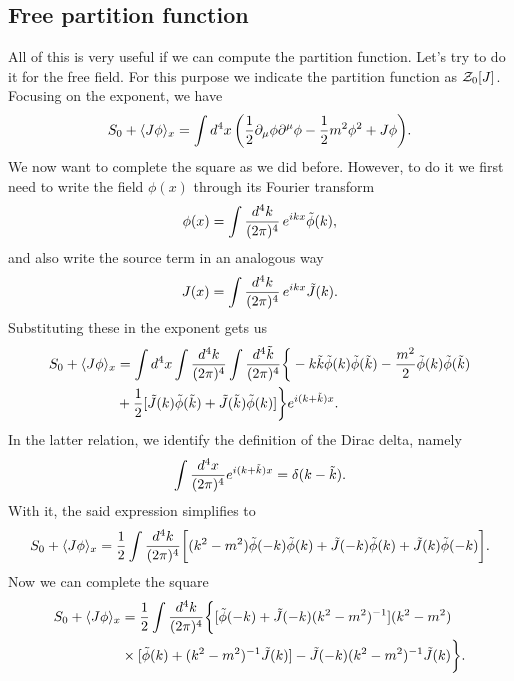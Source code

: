 \subsection{Free partition function}
All of this is very useful if we can compute the partition function. Let's try to do it for the free field. For this purpose we indicate the partition function as $\mathcal{Z}_0[J]$. Focusing on the exponent, we have 
\begin{equation}
    S_0 + \langle J\phi \rangle_x = \int d^4x\,\bigg(\frac{1}{2}\partial_\mu\phi\partial^\mu\phi - \frac{1}{2}m^2\phi^2 + J\phi\bigg).
\end{equation}
We now want to complete the square as we did before. However, to do it we first need to write the field $\phi(x)$ through its Fourier transform 
\begin{equation}
    \phi(x) = \int\frac{d^4k}{(2\pi)^4}\,e^{ikx}\tilde{\phi}(k),
\end{equation}
and also write the source term in an analogous way 
\begin{equation}
    J(x) = \int\frac{d^4k}{(2\pi)^4}\,e^{ikx}\tilde{J}(k).
\end{equation}
Substituting these in the exponent gets us  
\begin{equation}
    \begin{split}
        S_0 + \langle J\phi \rangle_x &= \int d^4x\int\frac{d^4k}{(2\pi)^4}\int\frac{d^4\tilde{k}}{(2\pi)^4}\bigg\{-k\tilde{k}\tilde{\phi}(k)\tilde{\phi}(\tilde{k}) - \frac{m^2}{2}\tilde{\phi}(k)\tilde{\phi}(\tilde{k}) \\
        &+ \frac{1}{2}[\tilde{J}(k)\tilde{\phi}(\tilde{k}) + \tilde{J}(\tilde{k})\tilde{\phi}(k)]\bigg\}e^{i(k + \tilde{k})x}.
    \end{split}
\end{equation}
In the latter relation, we identify the definition of the Dirac delta, namely 
\begin{equation}
\label{eq: Dirac delta definition}
    \int \frac{d^4x}{(2\pi)^4}e^{i(k + \tilde{k})x} = \delta(k - \tilde{k}).
\end{equation}
With it, the said expression simplifies to 
\begin{equation}
    S_0 + \langle J\phi \rangle_x = \frac{1}{2}\int\frac{d^4k}{(2\pi)^4}\bigg[(k^2 - m^2)\tilde{\phi}(-k)\tilde{\phi}(k) + \tilde{J}(-k)\tilde{\phi}(k) + \tilde{J}(k)\tilde{\phi}(-k)\bigg].
\end{equation}
Now we can complete the square 
\begin{equation}
    \begin{split}
        S_0 + \langle J\phi \rangle_x &= \frac{1}{2}\int\frac{d^4k}{(2\pi)^4}\bigg\{[\tilde{\phi}(-k) + \tilde{J}(-k)(k^2 - m^2)^{-1}](k^2 - m^2) \\
        &\times [\tilde{\phi}(k) + (k^2 - m^2)^{-1}\tilde{J}(k)] - \tilde{J}(-k)(k^2 - m^2)^{-1}\tilde{J}(k)\bigg\}.
    \end{split}
\end{equation}

